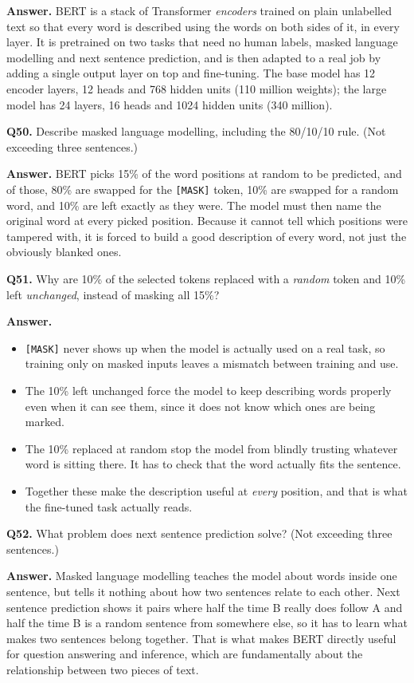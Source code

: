 \documentclass[11pt]{article}
\begin{document}
\textbf{Answer.} BERT is a stack of Transformer \emph{encoders} trained on plain unlabelled
text so that every word is described using the words on both sides of it, in every layer. It
is pretrained on two tasks that need no human labels, masked language modelling and next
sentence prediction, and is then adapted to a real job by adding a single output layer on top
and fine-tuning. The base model has 12 encoder layers, 12 heads and 768 hidden units (110
million weights); the large model has 24 layers, 16 heads and 1024 hidden units (340 million).

\medskip
\textbf{Q50.} Describe masked language modelling, including the 80/10/10 rule. (Not exceeding
three sentences.)

\textbf{Answer.} BERT picks 15\% of the word positions at random to be predicted, and of those,
80\% are swapped for the \texttt{[MASK]} token, 10\% are swapped for a random word, and 10\%
are left exactly as they were. The model must then name the original word at every picked
position. Because it cannot tell which positions were tampered with, it is forced to build a
good description of every word, not just the obviously blanked ones.

\medskip
\textbf{Q51.} Why are 10\% of the selected tokens replaced with a \emph{random} token and 10\%
left \emph{unchanged}, instead of masking all 15\%?

\textbf{Answer.}
\begin{itemize}
  \item \texttt{[MASK]} never shows up when the model is actually used on a real task, so training only on masked inputs leaves a mismatch between training and use.
  \item The 10\% left unchanged force the model to keep describing words properly even when it can see them, since it does not know which ones are being marked.
  \item The 10\% replaced at random stop the model from blindly trusting whatever word is sitting there. It has to check that the word actually fits the sentence.
  \item Together these make the description useful at \emph{every} position, and that is what the fine-tuned task actually reads.
\end{itemize}

\medskip
\textbf{Q52.} What problem does next sentence prediction solve? (Not exceeding three
sentences.)

\textbf{Answer.} Masked language modelling teaches the model about words inside one sentence,
but tells it nothing about how two sentences relate to each other. Next sentence prediction
shows it pairs where half the time B really does follow A and half the time B is a random
sentence from somewhere else, so it has to learn what makes two sentences belong together.
That is what makes BERT directly useful for question answering and inference, which are
fundamentally about the relationship between two pieces of text.
\end{document}
